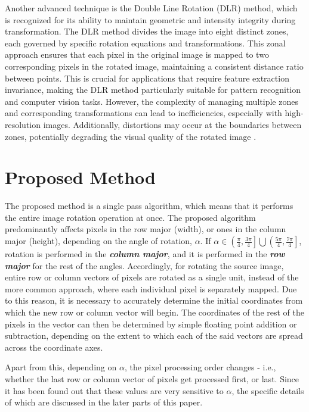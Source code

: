 \documentclass[conference]{IEEEtran}
\begin{document}
Another advanced technique is the Double Line Rotation (DLR) method, which is recognized for its ability to maintain geometric and intensity integrity during transformation. The DLR method divides the image into eight distinct zones, each governed by specific rotation equations and transformations. This zonal approach ensures that each pixel in the original image is mapped to two corresponding pixels in the rotated image, maintaining a consistent distance ratio between points. This is crucial for applications that require feature extraction invariance, making the DLR method particularly suitable for pattern recognition and computer vision tasks. However, the complexity of managing multiple zones and corresponding transformations can lead to inefficiencies, especially with high-resolution images. Additionally, distortions may occur at the boundaries between zones, potentially degrading the visual quality of the rotated image \cite{ashtari2015double}.




\section{Proposed Method}
The proposed method is a single pass algorithm, which means that it performs the entire image rotation operation at once. The proposed algorithm predominantly affects pixels in the row major (width), or ones in the column major (height), depending on the angle of rotation, $\alpha$.
If $\alpha \in \left ( \frac{\pi}{4}, \frac{3 \pi}{4} \right ] \bigcup \left ( \frac{5 \pi}{4}, \frac{7 \pi}{4} \right ]$, rotation is performed in the \textit{\textbf{column major}}, and it is performed in the \textit{\textbf{row major}} for the rest of the angles. Accordingly, for rotating the source image, entire row or column vectors of pixels are rotated as a single unit, instead of the more common approach, where each individual pixel is separately mapped. Due to this reason, it is necessary to accurately determine the initial coordinates from which the new row or column vector will begin. The coordinates of the rest of the pixels in the vector can then be determined by simple floating point addition or subtraction, depending on the extent to which each of the said vectors are spread across the coordinate axes.

Apart from this, depending on $\alpha$, the pixel processing order changes - i.e., whether the last row or column vector of pixels get processed first, or last. Since it has been found out that these values are very sensitive to $\alpha$, the specific details of which are discussed in the later parts of this paper.
\end{document}
